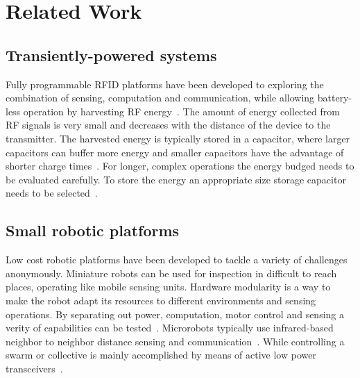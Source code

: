 \chapter{Related Work}
\label{chp:related_work}

\section{Transiently-powered systems}

Fully programmable RFID platforms have been developed to exploring the combination of sensing, computation and communication, while allowing battery-less operation by harvesting RF energy~\cite{sample_transim_2008}.
The amount of energy collected from RF signals is very small and decreases with the distance of the device to the transmitter.
The harvested energy is typically stored in a capacitor, where larger capacitors can buffer more energy and smaller capacitors have the advantage of shorter charge times~\cite{gummerson_mobisys_2010}.
For longer, complex operations the energy budged needs to be evaluated carefully.
To store the energy an appropriate size storage capacitor needs to be selected~\cite{naderiparizi_rfid_2015}.




\section{Small robotic platforms}

Low cost robotic platforms have been developed to tackle a variety of challenges anonymously.
Miniature robots can be used for inspection in difficult to reach places, operating like mobile sensing units.
Hardware modularity is a way to make the robot adapt its resources to different environments and sensing operations.
By separating out power, computation, motor control and sensing a verity of capabilities can be tested~\cite{sabelhaus_icra_2013, pickem_icra_2015, kim_iros_2016}.
Microrobots typically use infrared-based neighbor to neighbor distance sensing and communication~\cite{rubenstein_icra_2012, pickem_icra_2015, kim_iros_2016}.
While controlling a swarm or collective is mainly accomplished by means of active low power transceivers~\cite{sabelhaus_icra_2013, pickem_icra_2015, kim_iros_2016}. 

